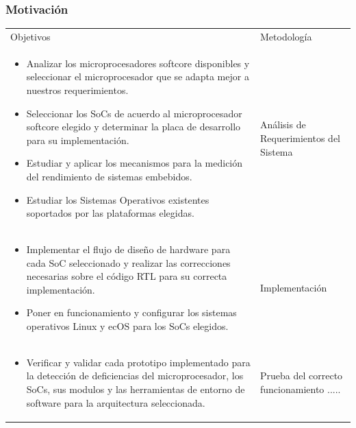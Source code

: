 \documentclass[xcolor=dvipsnames,mathserif,9pt]{beamer}
\begin{document}
  \begin{frame}[allowframebreaks] 
	\frametitle{Motivación}

\begin{table}[h!]
		\centering
\begin{tabular}{>{\columncolor[rgb]{0.8,0.8,0.8}} p{10cm} p{3cm} }
  \multicolumn{2}{>{\columncolor[rgb]{1,1,1}}c }{Objetivos Específicos}\\ 
\hline 
 Objetivos 								&  Metodología    \\ 
\hline 
 \begin {itemize}
 \item Analizar los microprocesadores softcore disponibles y seleccionar el microprocesador que se adapta mejor a nuestros requerimientos.
\item Seleccionar los SoCs de acuerdo al microprocesador softcore elegido y determinar la placa de desarrollo para su implementación.
\item Estudiar y aplicar los mecanismos para la medición del rendimiento de sistemas embebidos. 
\item Estudiar los Sistemas Operativos existentes soportados por las plataformas elegidas.												  
\end {itemize}  & Análisis de Requerimientos del Sistema \\ 
\hline 
 \begin {itemize}
 \item Implementar el flujo de diseño de hardware para cada SoC seleccionado y realizar las correcciones necesarias sobre el código RTL para su correcta implementación. 
\item Poner en funcionamiento y configurar los sistemas operativos Linux y ecOS para los SoCs elegidos.										  
\end {itemize}  & Implementación \\ 
\hline 
 \begin {itemize}
 \item Verificar y validar cada prototipo implementado para la detección de deficiencias del microprocesador, los SoCs, sus modulos y las herramientas de entorno de software para la arquitectura seleccionada.									  
\end {itemize}  &Prueba del correcto funcionamiento ..... \\ 
\hline 
\end{tabular}
\end{table}



\end{frame}
\end{document}
